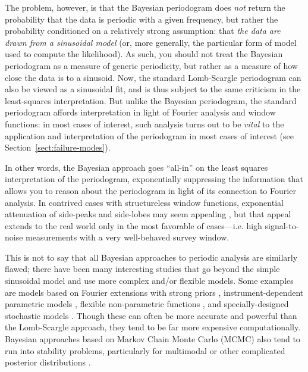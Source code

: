 \documentclass[preprint]{aastex}
\newcommand{\Sect}[1]{Section~\ref{sect:#1}}
\newcommand{\sect}[1]{\Sect{#1}}
\begin{document}
The problem, however, is that the Bayesian periodogram does {\it not} return
the probability that the data is periodic with a given frequency, but rather
the probability conditioned on a relatively strong assumption:
that {\it the data are drawn from a sinusoidal model} (or, more generally, the
particular form of model used to compute the likelihood).
As such, you should not treat the Bayesian periodogram as a measure of
generic periodicity, but rather as a measure of how close the data is to
a sinusoid.
Now, the standard Lomb-Scargle periodogram can also be viewed as a sinusoidal
fit, and is thus subject to the same criticism in the least-squares
interpretation.
But unlike the Bayesian periodogram, the standard periodogram affords
interpretation in light of Fourier analysis and window functions:
in most cases of interest, such analysis turns out to be {\it vital} to the
application and interpretation of the periodogram in most cases of interest
(see \sect{failure-modes}).

In other words, the Bayesian approach goes ``all-in'' on the least squares
interpretation of the periodogram, exponentially suppressing the information
that allows you to reason about the periodogram in light of its connection
to Fourier analysis.
In contrived cases with structureless window functions, exponential attenuation
of side-peaks and side-lobes may seem appealing \citep[see, e.g.][]{Mortier15},
but that appeal extends to the real world only in the most favorable of
cases---{i.e.} high signal-to-noise measurements with a very well-behaved
survey window.

This is not to say that all Bayesian approaches to periodic analysis are
similarly flawed; there have been many interesting studies that go beyond
the simple sinusoidal model and use more complex and/or flexible models.
Some examples are models based on Fourier
extensions with strong priors \citep[e.g.][]{Bretthorst88},
instrument-dependent parametric models \citep[e.g.][]{Angus16},
flexible non-parametric functions \citep[e.g.][]{Gregory92}, and
specially-designed stochastic models \citep[e.g.][]{Kelly14}.
Though these can often be more accurate and powerful than the Lomb-Scargle
approach, they tend to be far more expensive computationally.
Bayesian approaches based on Markov Chain Monte Carlo (MCMC) also tend to
run into stability problems,
particularly for multimodal or other complicated posterior distributions
\citep[See, for example, the RR Lyrae discussion in][]{Kelly14}.
\end{document}
